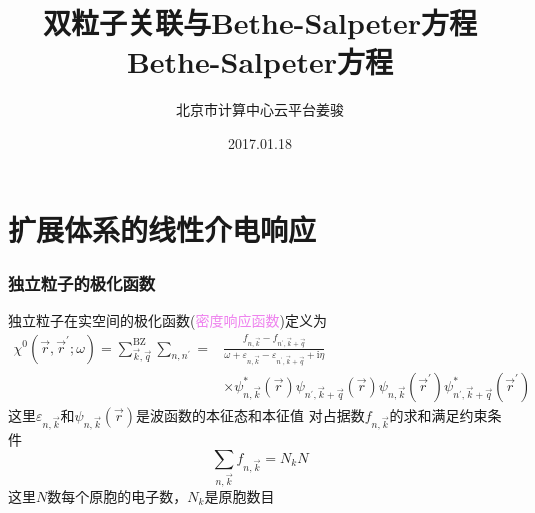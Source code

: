 \documentclass[cjk,slidestop,compress,mathserif,blue]{beamer}
\begin{document}

\title{双粒子关联与Bethe-Salpeter方程Bethe-Salpeter方程}

\author{北京市计算中心\;云平台\:姜骏}
\date{\textrm{2017.01.18}}
\frame{\titlepage}

\section*{}

\small
\section{扩展体系的线性介电响应}
\frame
{
	\frametitle{独立粒子的极化函数}
	独立粒子在实空间的极化函数(\textcolor{violet}{密度响应函数})定义为
	\begin{displaymath}
		\begin{aligned}
			\chi^0(\vec r,\vec r^{\prime};\omega)=\sum_{\vec k,\vec q}^{\mathrm{BZ}}\sum_{n,n^{\prime}}=&\frac{f_{n,\vec k}-f_{n^{\prime},\vec k+\vec q}}{\omega+\varepsilon_{n,\vec k}-\varepsilon_{n^{\prime},\vec k+\vec q}+\mathrm{i}\eta}\\
			&\times\psi_{n,\vec k}^{\ast}(\vec r)\psi_{n^{\prime},\vec k+\vec q}(\vec r)\psi_{n,\vec k}(\vec r^{\prime})\psi_{n^{\prime},\vec k+\vec q}^{\ast}(\vec r^{\prime})
		\end{aligned}
	\end{displaymath}
	这里$\varepsilon_{n,\vec k}$和$\psi_{n,\vec k}(\vec r)$是波函数的本征态和本征值
	\vskip 5pt
	对占据数$f_{n,\vec k}$的求和满足约束条件
	\begin{displaymath}
		\sum_{n,\vec k}f_{n,\vec k}=N_kN
	\end{displaymath}
	这里$N$数每个原胞的电子数，$N_k$是原胞数目
}
\end{document}
